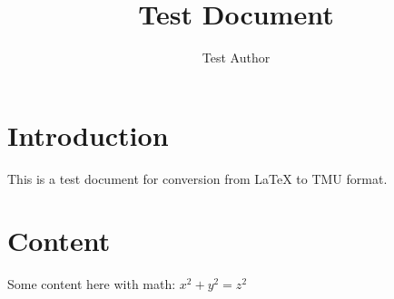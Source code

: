 \documentclass{article}
\begin{document}
\title{Test Document}
\author{Test Author}
\maketitle

\section{Introduction}
This is a test document for conversion from \LaTeX{} to TMU format.

\section{Content}
Some content here with math: $x^2 + y^2 = z^2$
\end{document}
